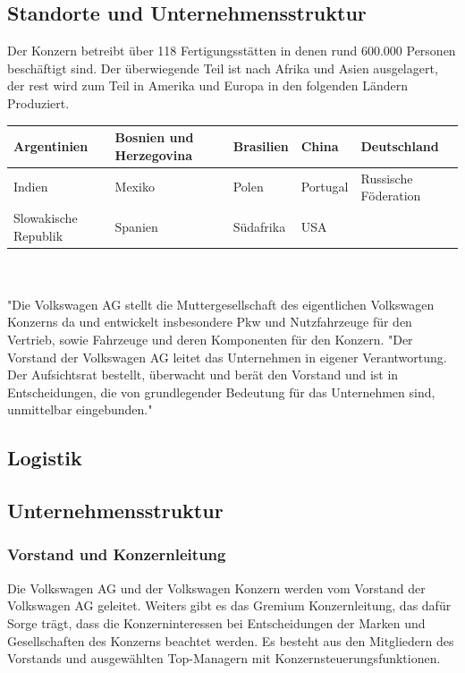 \documentclass[12pt]{article}
\begin{document}
\subsection{Standorte und Unternehmensstruktur}
Der Konzern betreibt über 118 Fertigungsstätten in denen rund 600.000 Personen beschäftigt sind.
Der überwiegende Teil ist nach Afrika und Asien ausgelagert, der rest wird zum Teil in Amerika und Europa in den
folgenden Ländern Produziert. \cite{produktionsstandorte}
\begin{table}[h]
	\begin{tabular}{|l|l|l|l|l|}
		\hline
		Argentinien          & Bosnien und Herzegovina & Brasilien & China    & Deutschland          \\ \hline
		Indien               & Mexiko                  & Polen     & Portugal & Russische Föderation \\ \hline
		Slowakische Republik & Spanien                 & Südafrika & USA      &                      \\ \hline
	\end{tabular}
\end{table}
\\\\
"Die Volkswagen AG stellt die Muttergesellschaft des eigentlichen Volkswagen Konzerns da und entwickelt insbesondere Pkw und Nutzfahrzeuge für den Vertrieb, sowie Fahrzeuge und deren Komponenten für den Konzern.
"Der Vorstand der Volkswagen AG leitet das Unternehmen in eigener Verantwortung. Der Aufsichtsrat bestellt, überwacht und berät den Vorstand und ist in Entscheidungen, die von grundlegender Bedeutung für das Unternehmen sind, unmittelbar eingebunden." \cite{struktur}



\subsection{Logistik}
\newpage
\subsection{Unternehmensstruktur}
\subsubsection{Vorstand und Konzernleitung}
Die Volkswagen AG und der Volkswagen Konzern werden vom Vorstand der Volkswagen AG geleitet.
Weiters gibt es das Gremium Konzernleitung, das dafür Sorge trägt, dass die Konzerninteressen bei Entscheidungen der Marken und Gesellschaften des Konzerns beachtet werden. Es besteht aus den Mitgliedern des Vorstands und ausgewählten Top-Managern mit Konzernsteuerungsfunktionen.
\end{document}

